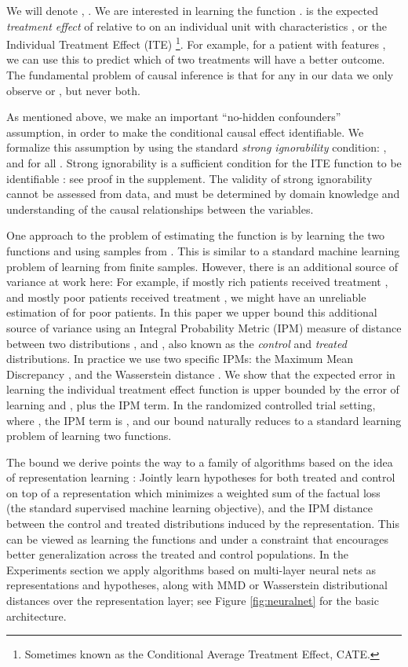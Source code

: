 \documentclass{article}
\begin{document}
We will denote , .
We are interested in learning the function .  is the expected \emph{treatment effect} of  relative to  on an individual unit with characteristics , or the Individual Treatment Effect (ITE) \footnote{Sometimes known as the Conditional Average Treatment Effect, CATE.}. For example, for a patient with features , we can use this to predict which of two treatments will have a better outcome. The fundamental problem of causal inference is that for any  in our data we only observe  or , but never both. 

As mentioned above, we make an important ``no-hidden confounders'' assumption, in order to make the conditional causal effect identifiable. We formalize this assumption by using the standard \emph{strong ignorability} condition: , and  for all . Strong ignorability is a sufficient condition for the ITE function  to be identifiable \cite{imbens2009recent,pearl2015detecting,rolling2014estimation}: see proof in the supplement. The validity of strong ignorability cannot be assessed from data, and must be determined by domain knowledge and understanding of the causal relationships between the variables.

One approach to the problem of estimating the function  is by learning the two functions  and  using samples from . This is similar to a standard machine learning problem of learning from finite samples. However, there is an additional source of variance at work here: For example, if mostly rich patients received treatment , and mostly poor patients received treatment , we might have an unreliable estimation of  for poor patients. In this paper we upper bound this additional source of variance using an Integral Probability Metric (IPM) measure of distance between two distributions , and , also known as the \emph{control} and \emph{treated} distributions. In practice we use two specific IPMs: the Maximum Mean Discrepancy \cite{gretton2012mmd}, and the Wasserstein distance \cite{villani2008optimal,cuturi2014fast}. We show that the expected error in learning the individual treatment effect function  is upper bounded by the error of learning  and , plus the IPM term. In the randomized controlled trial setting, where , the IPM term is , and our bound naturally reduces to a standard learning problem of learning two functions.

The bound we derive points the way to a family of algorithms based on the idea of representation learning \cite{bengio2013representation}: Jointly learn  hypotheses for both treated and control on top of a representation which minimizes a weighted sum of the factual loss (the standard supervised machine learning objective), and the IPM distance between the control and treated distributions induced by the representation. This can be viewed as learning the functions  and  under a constraint that encourages better generalization across the treated and control populations.
In the Experiments section we apply algorithms based on multi-layer neural nets as representations and hypotheses, along with MMD or Wasserstein distributional distances over the representation layer; see Figure \ref{fig:neuralnet} for the basic architecture.
\end{document}
